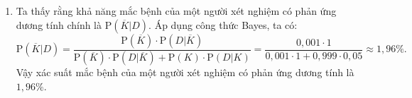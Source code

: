 \begin{vd}
{\begin{enumerate}
\begin{center}
			\end{center}
			\item Ta thấy rằng khả năng mắc bệnh của một người xét nghiệm có phản ứng dương tính chính là $\mathrm{P}\left(\overline{K}|D\right)$. Áp dụng công thức Bayes, ta có:
			\[\mathrm{P}\left(\overline{K}|D\right)=\dfrac{\mathrm{P}\left(\overline{K}\right)\cdot \mathrm{P}\left(D|\overline{K}\right)}{\mathrm{P}\left(\overline{K}\right)\cdot \mathrm{P}\left(D|\overline{K}\right) + \mathrm{P}(K)\cdot\mathrm{P}(D|K)}=\dfrac{0{,}001\cdot 1}{0{,}001\cdot 1 + 0{,}999 \cdot 0{,}05}\approx 1{,}96\%.\]
			Vậy xác suất mắc bệnh của một người xét nghiệm có phản ứng dương tính là $1{,}96\%$.
		\end{enumerate}
	}
\end{vd}
